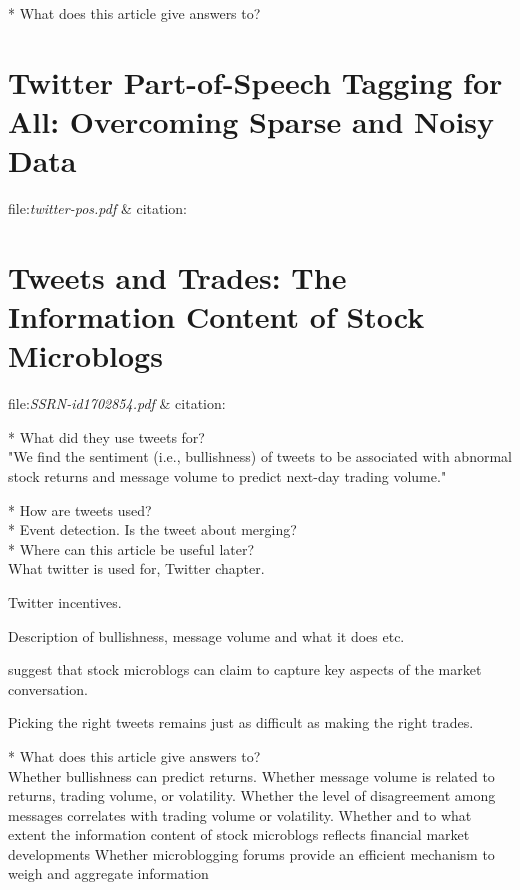 * What does this article give answers to?\\


\section{Twitter Part-of-Speech Tagging for All: Overcoming Sparse and Noisy
Data}
file:\textit{twitter-pos.pdf} & citation:\cite[]{twitter-pos}



\section{Tweets and Trades: The Information Content of Stock Microblogs}
file:\textit{SSRN-id1702854.pdf} & citation:\cite[]{sprenger10} %

* What did they use tweets for?\\
"We find the sentiment (i.e., bullishness) of tweets to be associated with abnormal
stock returns and message volume to predict next-day trading volume."
\cite[]{sprenger10} 

* How are tweets used?\\

* Event detection. Is the tweet about merging? \\

* Where can this article be useful later? \\
What twitter is used for, Twitter chapter. 

Twitter incentives. \cite[p4]{sprenger10}

Description of bullishness, message volume and what it does etc. 

\cite[p52]{sprenger10} suggest that stock microblogs can claim to capture key aspects of the market
conversation.

Picking the right tweets remains just as difficult as making the
right trades.

* What does this article give answers to?\\
Whether bullishness can predict returns.
Whether message volume is related to returns, trading volume, or volatility.
Whether the level of disagreement among messages correlates with trading volume
or volatility.
Whether and to what extent the information content of stock microblogs reflects financial market developments
Whether microblogging forums provide an efficient mechanism to weigh and aggregate information


